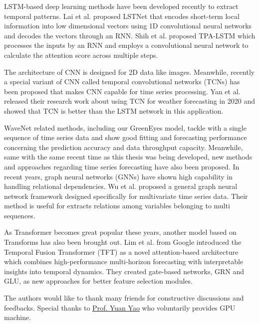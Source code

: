 \documentclass[
twocolumn,
]{ceurart}
\begin{document}
LSTM-based deep learning methods have been developed recently to extract temporal patterns. Lai et al. proposed LSTNet \cite{lai2018modeling} that encodes short-term local information into low dimensional vectors using 1D convolutional neural networks and decodes the vectors through an RNN. Shih et al. proposed TPA-LSTM \cite{shih2019temporal}  which processes the inputs by an RNN and employs a convolutional neural network to calculate the attention score across multiple steps.

The architecture of CNN is designed for 2D data like images. Meanwhile, recently a special variant of CNN called temporal convolutional networks (TCNs) \cite{lea2016temporal} has been proposed that makes CNN capable for time series processing. Yan et al. \cite{yan2020temporal} released their research work about using TCN for weather forecasting in 2020 and showed that TCN is better than the LSTM network in this application.

WaveNet related methods, including our GreenEyes model, tackle with a single sequence of time series data and show good fitting and forecasting performance concerning the prediction accuracy and data throughput capacity. Meanwhile, same with the same recent time as this thesis was being developed, new methods and approaches regarding time series forecasting have also been proposed. In recent years, graph neural networks (GNNs) have shown high capability in handling relational dependencies. Wu et al. \cite{wu2020connecting} proposed a general graph neural network framework designed specifically for multivariate time series data. Their method is useful for extracts relations among variables belonging to multi sequences.

As Transformer \cite{vaswani2017attention} becomes great popular these years, another model based on Transforms has also been brought out. Lim et al. \cite{lim2021temporal} from Google introduced the Temporal Fusion Transformer (TFT) as a novel attention-based architecture which combines high-performance multi-horizon forecasting with interpretable insights into temporal dynamics. They created gate-based networks, GRN and GLU, as new approaches for better feature selection modules.

\begin{acknowledgments}
  The authors would like to thank many friends for constructive discussions and feedbacks. Special thanks to \href{https://www.math.hkust.edu.hk/people/faculty/profile/yuany/}{Prof. Yuan Yao} who voluntarily provides GPU machine.
\end{acknowledgments}


\end{document}
